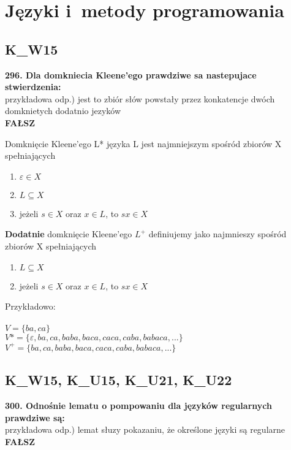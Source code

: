 \chapter{Języki i~metody programowania}
\PartialToc

\section{K\_W15}
\textbf{296. Dla domkniecia Kleene’ego prawdziwe sa nastepujace stwierdzenia:}\\
przykładowa odp.) jest to zbiór słów powstały przez konkatencje dwóch domknietych dodatnio jezyków\\
\textbf{FAŁSZ}

Domknięcie Kleene'ego L* języka L jest najmniejszym spośród zbiorów X spełniających\\
\begin{enumerate}
\item $\varepsilon \in X$
\item $L \subseteq X$
\item jeżeli $s \in X$ oraz $x \in L$, to $sx \in X $
\end{enumerate}

\textbf{Dodatnie} domknięcie Kleene'ego $L^+$ definiujemy jako najmnieszy spośród zbiorów X spełniających\\
\begin{enumerate}
\item $L \subseteq X$
\item jeżeli $s \in X$ oraz $x \in L$, to $sx \in X $
\end{enumerate}

Przykładowo:\\\\
$V = \{ba, ca\}$\\
$V* = \{\varepsilon, ba, ca, baba, baca, caca, caba, babaca, ...\}$\\
$V^+ = \{ba, ca, baba, baca, caca, caba, babaca, ...\}$




\section{K\_W15, K\_U15, K\_U21, K\_U22}
\textbf{300. Odnośnie lematu o pompowaniu dla języków regularnych prawdziwe są:}\\
przykładowa odp.) lemat słuzy pokazaniu, że określone języki są regularne\\
\textbf{FAŁSZ}\\

